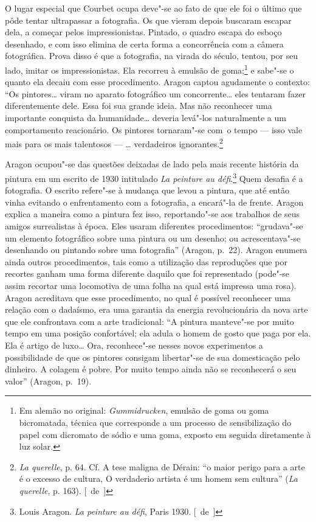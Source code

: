O lugar especial que Courbet ocupa deve"-se ao fato de que ele foi o
último que pôde tentar ultrapassar a fotografia. Os que vieram depois buscaram
escapar dela, a começar pelos impressionistas. Pintado, o quadro escapa
do esboço desenhado, e com isso elimina de certa forma a
concorrência com a câmera fotográfica. Prova disso é que a fotografia, na
virada do século, tentou, por seu lado, imitar os impressionistas. Ela
recorreu à emulsão de goma;\footnote{Em alemão no original:
  \emph{Gummidrucken}, emulsão de goma ou goma bicromatada, técnica que
  corresponde a um processo de sensibilização do papel com dicromato de
  sódio e uma goma, exposto em seguida diretamente à luz solar. \versal{[N.~T.]}} e
sabe"-se o quanto ela decaiu com esse procedimento. Aragon captou
agudamente o contexto: ``Os pintores\ldots{} viram no aparato fotográfico um
concorrente\ldots{} eles tentaram fazer diferentemente dele. Essa foi sua
grande ideia. Mas não reconhecer uma importante conquista da humanidade\ldots{} deveria levá"-los naturalmente a um comportamento reacionário. Os
pintores tornaram"-se com~o tempo --- isso vale mais para os mais
talentosos --- \ldots{} verdadeiros ignorantes.\footnote{\emph{La querelle}, p.
  64. Cf. A tese maligna de Dérain: ``o maior perigo para a arte é o
  excesso de cultura, O verdaderio artista é um homem sem cultura''
  (\emph{La querelle}, p. 163). [~de~]}

Aragon ocupou"-se das questões deixadas de lado pela mais recente história da
pintura em um escrito de 1930 intitulado \emph{La peinture au
défi}.\footnote{Louis Aragon. \emph{La peinture au défi}, Paris 1930. [~de~]}
Quem desafia é a fotografia. O escrito refere"-se à mudança que levou a
pintura, que até então vinha evitando o enfrentamento com a fotografia, a
encará"-la de frente. Aragon explica a maneira como a pintura fez isso,
reportando"-se aos trabalhos de seus amigos surrealistas à época. Eles usaram
diferentes procedimentos: ``grudava"-se um elemento fotográfico sobre uma
pintura ou um desenho; ou acrescentava"-se desenhando ou pintando sobre uma
fotografia'' (Aragon, p.~22). Aragon enumera ainda outros
procedimentos, tais como a utilização das reproduções que por recortes
ganham uma forma diferente daquilo que foi representado (pode"-se assim
recortar uma locomotiva de uma folha na qual está impressa uma rosa).
Aragon acreditava que esse procedimento, no qual é possível reconhecer uma
relação com o dadaísmo, era uma garantia da energia revolucionária
da nova arte que ele confrontava com a arte tradicional: ``A pintura
manteve"-se por muito tempo em uma posição confortável; ela adula o homem de gosto
que paga por ela. Ela é artigo de luxo\ldots{} Ora,
reconhece"-se nesses novos experimentos a possibilidade de que os pintores
consigam libertar"-se de sua domesticação pelo dinheiro. A
colagem é pobre. Por muito tempo ainda não se reconhecerá o seu valor'' (Aragon, p.~19).

